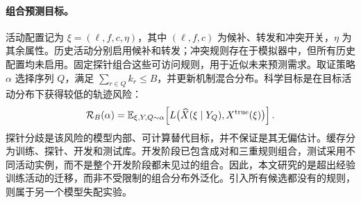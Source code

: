 \paragraph{组合预测目标。}
活动配置记为 $\xi=(\ell,f,c,\eta)$，其中 $(\ell,f,c)$ 为候补、转发和冲突开关，$\eta$ 为其余属性。历史活动分别启用候补和转发；冲突规则存在于模拟器中，但所有历史配置均未启用。固定探针组合这些可访问规则，用于近似未来预测需求。取证策略 $\alpha$ 选择序列 $Q$，满足 $\sum_{r\in Q}k_r\leq B$，并更新机制混合分布。科学目标是在目标活动分布下获得较低的轨迹风险：
\begin{equation}
 \mathcal R_B(\alpha)=\mathbb{E}_{\xi,Y,Q\sim\alpha}\!\left[
 L\big(\widehat X(\xi\mid Y_Q),X^{\mathrm{true}}(\xi)\big)\right].
 \label{eq:risk}
\end{equation}
探针分歧是该风险的模型内部、可计算替代目标，并不保证是其无偏估计。缓存分为训练、探针、开发和测试库。开发阶段已包含成对和三重规则组合，测试采用不同活动实例，而不是整个开发阶段都未见过的组合。因此，本文研究的是超出经验训练活动的迁移，而非不受限制的组合分布外泛化。引入所有候选都没有的规则，则属于另一个模型失配实验。
